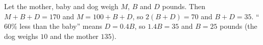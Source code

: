 Let the mother, baby and dog weigh $M$, $B$ and $D$ pounds. Then $M+B+D=170$ and $M=100+B+D$, so $2(B+D)=70$ and $B+D=35$. ``$60\%$ less than the baby'' means $D=0.4B$, so $1.4B=35$ and $B=\boxed{25}$ pounds (the dog weighs $10$ and the mother $135$).
